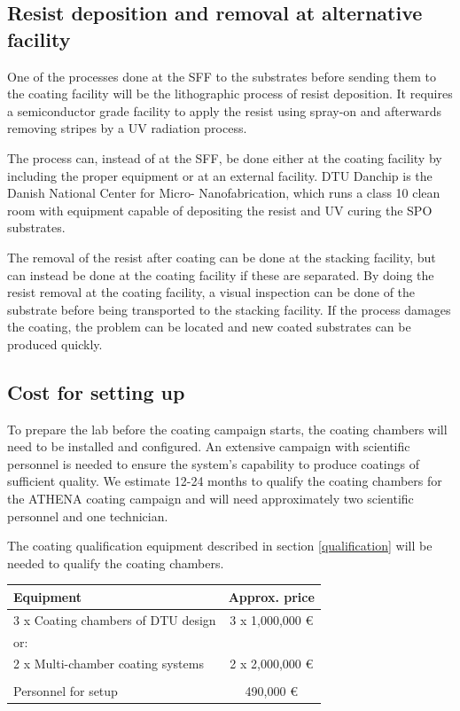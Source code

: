 \subsection{Resist deposition and removal at alternative facility}
One of the processes done at the SFF to the substrates before sending them to the coating facility will be the lithographic process of resist deposition. It requires a semiconductor grade facility to apply the resist using spray-on and afterwards removing stripes by a UV radiation process.

The process can, instead of at the SFF, be done either at the coating facility by including the proper equipment or at an external facility. DTU Danchip is the Danish National Center for Micro- Nanofabrication, which runs a class 10 clean room with equipment capable of depositing the resist and UV curing the SPO substrates.

The removal of the resist after coating can be done at the stacking facility, but can instead be done at the coating facility if these are separated. By doing the resist removal at the coating facility, a visual inspection can be done of the substrate before being transported to the stacking facility. If the process damages the coating, the problem can be located and new coated substrates can be produced quickly.


\subsection{Cost for setting up}
To prepare the lab before the coating campaign starts, the coating chambers will need to be installed and configured. An extensive campaign with scientific personnel is needed to ensure the system's capability to produce coatings of sufficient quality. We estimate 12-24 months to qualify the coating chambers for the ATHENA coating campaign and will need approximately two scientific personnel and one technician.

The coating qualification equipment described in section \ref{qualification} will be needed to qualify the coating chambers.


\begin{table}[htbp]
	\centering
\begin{tabular}{l|c}
Equipment & Approx. price \\
\hline
\hline
3 x Coating chambers of DTU design  & 3 x 1,000,000 \euro\\
\hline
or:\\
\hline
2 x Multi-chamber coating systems & 2 x 2,000,000 \euro \\
\hline
\\
\hline
Personnel for setup & 490,000 \euro\\
\end{tabular}
\end{table}


